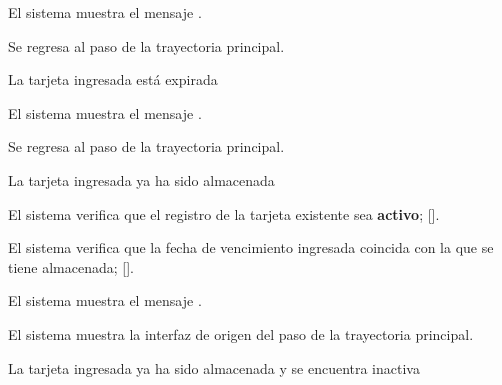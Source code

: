 {\begin{trayectoriaAlternativa}
    \item El sistema muestra el mensaje
      .

    \item Se regresa al paso  de la trayectoria
      principal.

  \end{trayectoriaAlternativa}


  \begin{trayectoriaAlternativa}
    {La tarjeta ingresada está expirada}

    \item El sistema muestra el mensaje
      .

    \item Se regresa al paso  de la trayectoria
      principal.

  \end{trayectoriaAlternativa}


  \begin{trayectoriaAlternativa}
    {La tarjeta ingresada ya ha sido almacenada}

    \item El sistema verifica que el registro de la tarjeta existente sea
      \textbf{activo}; [].

    \item El sistema verifica que la fecha de vencimiento ingresada coincida
      con la que se tiene almacenada;
      [].

    \item El sistema muestra el mensaje
      .

    \item El sistema muestra la interfaz de origen del paso
       de la trayectoria principal.

  \end{trayectoriaAlternativa}


  \begin{trayectoriaAlternativa}
    {La tarjeta ingresada ya ha sido almacenada y se encuentra inactiva}


\end{trayectoriaAlternativa}}
